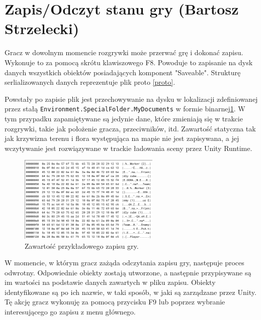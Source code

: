\section{Zapis/Odczyt stanu gry (Bartosz Strzelecki)}

Gracz w dowolnym momencie rozgrywki może przerwać grę i dokonać zapisu. Wykonuje to
za pomocą skrótu klawiszowego F8. Powoduje to zapisanie na dysk danych wszystkich obiektów posiadających
komponent "Saveable". Strukturę serlializowanych danych reprezentuje plik proto \ref{proto}.


Powstały po zapisie plik jest przechowywanie na dysku w lokalizacji zdefiniowanej przez stałą \verb|Environment.SpecialFolder.MyDocuments| w formie binarnej\ref{save}.
W tym przypadku zapamiętywane są jedynie dane, które zmieniają się w trakcie rozgrywki, takie jak położenie gracza, przeciwników, itd. 
Zawartość statyczna tak jak krzywizna terenu i flora występująca na mapie nie jest zapisywana, a jej wczytywanie jest rozwiązywane
w trackie ładowania sceny przez Unity Runtime.

\begin{figure}[h]
\centering
\includegraphics[width=0.6\textwidth]{images/save}
\caption{Zawartość przykładowego zapisu gry.}
\label{save}
\end{figure}

W momencie, w którym gracz zażąda odczytania zapisu gry, następuje proces odwrotny. Odpowiednie obiekty zostają utworzone,
a następnie przypisywane są im wartości na podstawie danych zawartych w pliku zapisu. Obiekty identyfikowane
są po ich nazwie, w taki sposób, w jaki są zarządzane przez Unity.
Tę akcję gracz wykonuję za pomocą przycisku F9 lub poprzez wybranie interesującego go zapisu z menu głównego.

